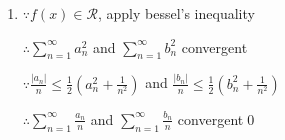 \begin{enumerate}[1]
    \item 
    $\because f(x) \in \mathcal{R} $, apply bessel's inequality
    \par $\therefore \sum \limits_{n=1}^{\infty}a_n^2$ and $\sum \limits_{n=1}^{\infty}b_n^2$ convergent
    \par $\because \frac{|a_n|}{n}\leq\frac{1}{2}(a_n^2+\frac{1}{n^2})$ and $\frac{|b_n|}{n}\leq\frac{1}{2}(b_n^2+\frac{1}{n^2})$
    \par $\therefore \sum \limits_{n=1}^{\infty}\frac{a_n}{n}$ and $\sum \limits_{n=1}^{\infty}\frac{b_n}{n}$ convergent\qed
\end{enumerate}
